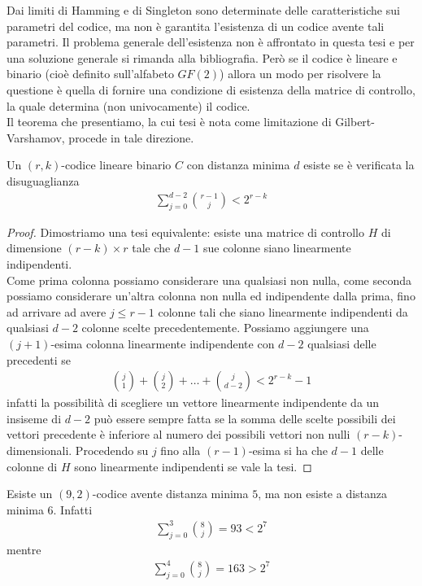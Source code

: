 Dai limiti di Hamming e di Singleton sono determinate delle caratteristiche sui parametri del codice, ma non è garantita l'esistenza di un codice avente tali parametri. Il problema generale dell'esistenza non è affrontato in questa tesi e per una soluzione generale si rimanda alla bibliografia. Però se il codice è lineare e binario (cioè definito sull'alfabeto $GF(2)$) allora un modo per risolvere la questione è quella di fornire una condizione di esistenza della matrice di controllo, la quale determina (non univocamente) il codice. \\
Il teorema che presentiamo, la cui tesi è nota come limitazione di Gilbert-Varshamov, procede in tale direzione.
\begin{teorema}
   Un $(r,k)$-codice lineare binario $C$ con distanza minima $d$ esiste se è verificata la disuguaglianza
   \begin{align*}
      \sum_{j=0}^{d-2} \binom{r-1}{j} < 2^{r-k}
   \end{align*}
\end{teorema}
\begin{proof}
   Dimostriamo una tesi equivalente: esiste una matrice di controllo $H$ di dimensione $(r-k)\times r$ tale che $d-1$ sue colonne siano linearmente indipendenti.\\
   Come prima colonna possiamo considerare una qualsiasi non nulla, come seconda possiamo considerare un'altra colonna non nulla ed indipendente dalla prima, fino ad arrivare ad avere $j \leq r-1$ colonne tali che siano linearmente indipendenti da qualsiasi $d-2$ colonne scelte precedentemente.
   Possiamo aggiungere una $(j+1)$-esima colonna linearmente indipendente con $d-2$ qualsiasi delle precedenti se
   \begin{align*}
      \binom{j}{1} + \binom{j}{2}+ \dots + \binom{j}{d-2}
      <
      2^{r-k} - 1
   \end{align*}
   infatti la possibilità di scegliere un vettore linearmente indipendente da un insiseme di $d-2$ può essere sempre fatta se la somma delle scelte possibili dei vettori precedente è inferiore al numero dei possibili vettori non nulli $(r-k)$-dimensionali.
   Procedendo su $j$ fino alla $(r-1)$-esima si ha che $d-1$ delle colonne di $H$ sono linearmente indipendenti se vale la tesi.
\end{proof}
\begin{esempio}
   Esiste un $(9,2)$-codice avente distanza minima $5$, ma non esiste a distanza minima $6$. Infatti
   \begin{align*}
      \sum_{j=0}^{3} \binom{8}{j} = 93 < 2^{7}
   \end{align*}
   mentre
   \begin{align*}
      \sum_{j=0}^{4} \binom{8}{j} = 163 > 2^{7}
   \end{align*}
\end{esempio}

